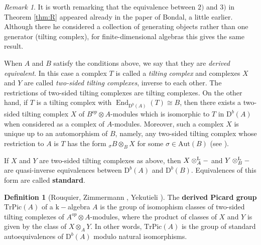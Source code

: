\documentclass[12pt]{amsart}
\theoremstyle{plain}
\theoremstyle{remark}
\newtheorem*{remark}{Remark}
\theoremstyle{definition}
\newtheorem{definition}{Definition}[section]
\newcommand{\End}{\mathop{\mathrm{End}}\nolimits}
\newcommand{\Aut}{{\mathrm{Aut}}}
\newcommand{\TrPic}{{\mathrm{TrPic}}}
\newcommand{\D}{{\mathrm{D}}}
\newcommand{\Li}{{\mathrm{L}}}
\def\kk{\mathrm{k}}
\begin{document}
\begin{remark} It is worth remarking that the equivalence between $2)$ and $3)$ in Theorem \ref{thm:R} appeared already in the paper \cite{Bo} of Bondal, a little earlier. Although there he considered a collection of generating objects rather than one generator (tilting complex), for finite-dimensional algebras this gives the same result. \end{remark}

When $A$ and $B$ satisfy the conditions above, we say that they are \emph{derived equivalent}. In this case a complex $T$ is called a \emph{tilting complex} and complexes $X$ and $Y$ are called \emph{two-sided tilting complexes}, inverse to each other. The restrictions of two-sided tilting complexes are tilting complexes. On the other hand, if $T$ is a tilting complex with $\End_{\D^b(A)}(T) \cong B$, then there exists a two-sided tilting complex $X$ of $B^{op} \otimes A$-modules which is isomorphic to $T$ in $\D^b(A)$ when considered as a complex of $A$-modules. Moreover, such a complex $X$ is unique up to an automorphism of $B$, namely, any two-sided tilting complex whose restriction to $A$ is $T$ has the form $_\sigma B \otimes_B X$ for some $\sigma \in \Aut(B)$ (see \cite{RZ}).

If $X$ and $Y$ are two-sided tilting complexes as above, then $X \otimes_A^{{\bf \Li}} - $ and $Y \otimes_B^{{\bf \Li}} - $ are quasi-inverse equivalences between $\D^b(A)$ and $\D^b(B)$. Equivalences of this form are called {\bf standard}.


\begin{definition}[Rouquier, Zimmermann \cite{RZ}, Yekutieli \cite{Y}] The {\bf derived Picard group} $\TrPic(A)$ of a $\kk-$algebra $A$ is the group of isomophism classes of two-sided tilting complexes of $A^{op} \otimes A$-modules, where the product of classes of $X$ and $Y$ is given by the class of $X \otimes_A Y$. In other words, $\TrPic(A)$ is the group of standard autoequivalences of $\D^b(A)$ modulo natural isomorphisms. 
\end{definition}
\end{document}
